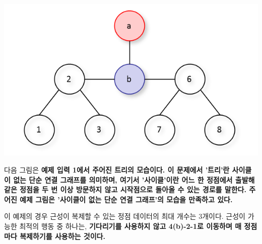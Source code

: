 \includegraphics{sot-ex1pic.png}


다음 그림은 \bf{예제 입력 1}에서 주어진 \bf{트리}의 모습이다. 이 문제에서 '\bf{트리}'란 사이클이 없는 단순 연결 그래프를 의미하며, 여기서 '사이클'이란 어느 한 정점에서 출발해 같은 정점을 두 번 이상 방문하지 않고 시작점으로 돌아올 수 있는 경로를 말한다. 주어진 예제 그림은 '사이클이 없는 단순 연결 그래프'의 모습을 만족하고 있다.


이 예제의 경우 근성이 복제할 수 있는 정점 데이터의 최대 개수는 3개이다. 근성이 가능한 최적의 행동 중 하나는, \bf{기다리기}를 사용하지 않고 4(b)-2-1로 이동하며 매 정점마다 \bf{복제하기}를 사용하는 것이다.
